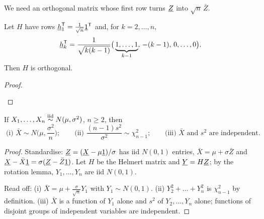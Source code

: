 We need an orthogonal matrix whose first row turns $\underline{Z}$ into $\sqrt n\,\bar Z$.

\begin{lemma}
Let $H$ have rows $\underline{h}_1^{\mathsf{T}}=\frac1{\sqrt n}\underline{1}^{\mathsf{T}}$ and, for $k=2,\dots,n$,
\[
  \underline{h}_k^{\mathsf{T}}=\frac{1}{\sqrt{k(k-1)}}\big(\underbrace{1,\dots,1}_{k-1},\,-(k-1),\,0,\dots,0\big).
\]
Then $H$ is orthogonal.
\end{lemma}
\begin{proof}
\begin{deriv}
\end{deriv}
\end{proof}

\begin{theorem}
If $X_1,\dots,X_n\overset{\text{iid}}{\sim} N(\mu,\sigma^2)$, $n\ge2$, then
\[
  \boxed{\;\text{(i) }\bar X\sim N\Big(\mu,\frac{\sigma^2}{n}\Big);\qquad\text{(ii) }\frac{(n-1)s^2}{\sigma^2}\sim\chi^2_{n-1};\qquad\text{(iii) }\bar X\text{ and }s^2\text{ are independent.}\;}
\]
\end{theorem}
\begin{proof}
Standardise: $\underline{Z}=(\underline{X}-\mu\underline{1})/\sigma$ has iid $N(0,1)$ entries, $\bar X=\mu+\sigma\bar Z$ and $\underline{X}-\bar X\underline{1}=\sigma(\underline{Z}-\bar Z\underline{1})$. Let $H$ be the Helmert matrix and $\underline{Y}=H\underline{Z}$; by the rotation lemma, $Y_1,\dots,Y_n$ are iid $N(0,1)$.
\begin{deriv}
\end{deriv}
Read off: (i) $\bar X=\mu+\frac{\sigma}{\sqrt n}Y_1$ with $Y_1\sim N(0,1)$. (ii) $Y_2^2+\dots+Y_n^2$ is $\chi^2_{n-1}$ by definition. (iii) $\bar X$ is a function of $Y_1$ alone and $s^2$ of $Y_2,\dots,Y_n$ alone; functions of disjoint groups of independent variables are independent.
\end{proof}

